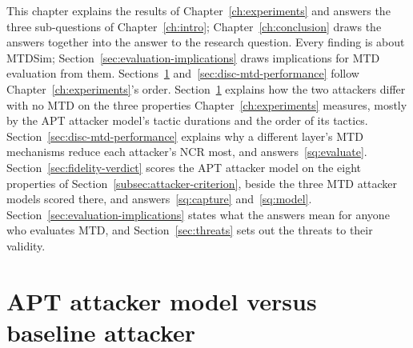 \documentclass{cshonours}
\begin{document}
This chapter explains the results of Chapter~\ref{ch:experiments} and
answers the three sub-questions of Chapter~\ref{ch:intro}; Chapter~\ref{ch:conclusion}
draws the answers together into the answer to the research question. Every
finding is about MTDSim; Section~\ref{sec:evaluation-implications} draws
implications for MTD evaluation from them. Sections~\ref{sec:disc-behaviour}
and~\ref{sec:disc-mtd-performance} follow Chapter~\ref{ch:experiments}'s
order. Section~\ref{sec:disc-behaviour} explains how the two attackers
differ with no MTD on the three properties Chapter~\ref{ch:experiments}
measures, mostly by the APT attacker model's tactic durations and the order
of its tactics.
Section~\ref{sec:disc-mtd-performance} explains why a different layer's MTD
mechanisms reduce each attacker's NCR most, and answers~\ref{sq:evaluate}.
Section~\ref{sec:fidelity-verdict} scores the APT attacker model on the eight
properties of Section~\ref{subsec:attacker-criterion}, beside the three MTD
attacker models scored there, and answers~\ref{sq:capture}
and~\ref{sq:model}. Section~\ref{sec:evaluation-implications} states what
the answers mean for anyone who evaluates MTD, and Section~\ref{sec:threats}
sets out the threats to their validity.

\section{APT attacker model versus baseline attacker}
\label{sec:disc-behaviour}
\end{document}
